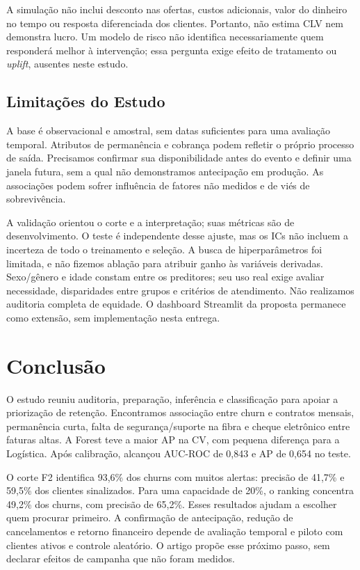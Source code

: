 \documentclass[12pt]{article}
\begin{document}
A simulação não inclui desconto nas ofertas, custos adicionais, valor do dinheiro no tempo ou resposta diferenciada dos clientes. Portanto, não estima CLV nem demonstra lucro. Um modelo de risco não identifica necessariamente quem responderá melhor à intervenção; essa pergunta exige efeito de tratamento ou \textit{uplift}, ausentes neste estudo.

\subsection{Limitações do Estudo}
A base é observacional e amostral, sem datas suficientes para uma avaliação temporal. Atributos de permanência e cobrança podem refletir o próprio processo de saída. Precisamos confirmar sua disponibilidade antes do evento e definir uma janela futura, sem a qual não demonstramos antecipação em produção. As associações podem sofrer influência de fatores não medidos e de viés de sobrevivência.

A validação orientou o corte e a interpretação; suas métricas são de desenvolvimento. O teste é independente desse ajuste, mas os ICs não incluem a incerteza de todo o treinamento e seleção. A busca de hiperparâmetros foi limitada, e não fizemos ablação para atribuir ganho às variáveis derivadas. Sexo/gênero e idade constam entre os preditores; seu uso real exige avaliar necessidade, disparidades entre grupos e critérios de atendimento. Não realizamos auditoria completa de equidade. O dashboard Streamlit da proposta permanece como extensão, sem implementação nesta entrega.

\section{Conclusão}\label{sec:conclusao}
O estudo reuniu auditoria, preparação, inferência e classificação para apoiar a priorização de retenção. Encontramos associação entre churn e contratos mensais, permanência curta, falta de segurança/suporte na fibra e cheque eletrônico entre faturas altas. A Forest teve a maior AP na CV, com pequena diferença para a Logística. Após calibração, alcançou AUC-ROC de 0,843 e AP de 0,654 no teste.

O corte F2 identifica 93,6\% dos churns com muitos alertas: precisão de 41,7\% e 59,5\% dos clientes sinalizados. Para uma capacidade de 20\%, o ranking concentra 49,2\% dos churns, com precisão de 65,2\%. Esses resultados ajudam a escolher quem procurar primeiro. A confirmação de antecipação, redução de cancelamentos e retorno financeiro depende de avaliação temporal e piloto com clientes ativos e controle aleatório. O artigo propõe esse próximo passo, sem declarar efeitos de campanha que não foram medidos.
\end{document}
